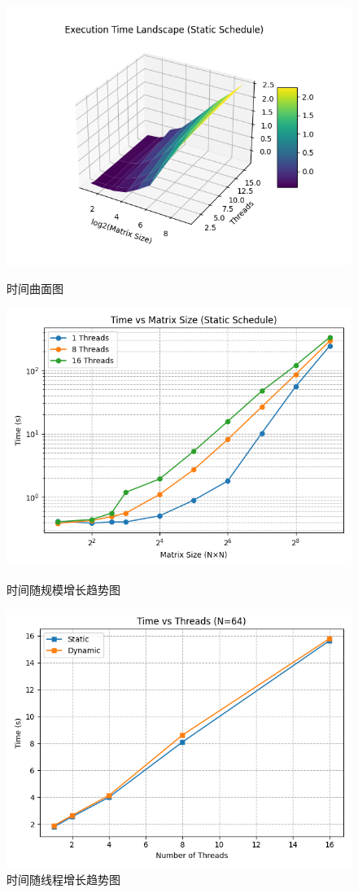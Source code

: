 \documentclass[a4paper, utf8]{ctexart}
\begin{document}
	\begin{figure}[htbp]
		\centering
		\begin{minipage}{.27\textwidth}
			\centering
			\includegraphics[width=\textwidth]{./figure/TimeLandscape.png}
			\caption{时间曲面图}
		\end{minipage}
		\begin{minipage}{.35\textwidth}
			\centering
			\includegraphics[width=.8\textwidth]{./figure/TimevsSize.png}
			\caption{时间随规模增长趋势图}
		\end{minipage}
		\begin{minipage}{.35\textwidth}
			\centering
			\includegraphics[width=.8\textwidth]{./figure/TimevsThreads.png}
			\caption{时间随线程增长趋势图}
		\end{minipage}
	\end{figure}
	
\end{document}
